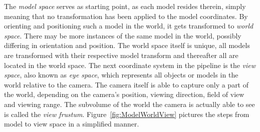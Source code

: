 The \textit{model space} serves as starting point, as each model resides
therein, simply meaning that no transformation has been applied to the model
coordinates. By orienting and positioning such a model in the world, it gets
transformed to \textit{world space}. There may be more instances of the same
model in the world, possibly differing in orientation and position. The world
space itself is unique, all models are transformed with their respective model
transform and thereafter all are located in the world space. The next
coordinate system in the pipeline is the \textit{view space}, also known as
\textit{eye space}, which represents all objects or models in the world relative
to the camera. The camera itself is able to capture only a part of the world,
depending on the camera's position, viewing direction, field of view and viewing
range. The subvolume of the world the camera is actually able to see is called
the \textit{view frustum}. Figure~\ref{fig:ModelWorldView} pictures the
steps from model to view space in a simplified manner.
